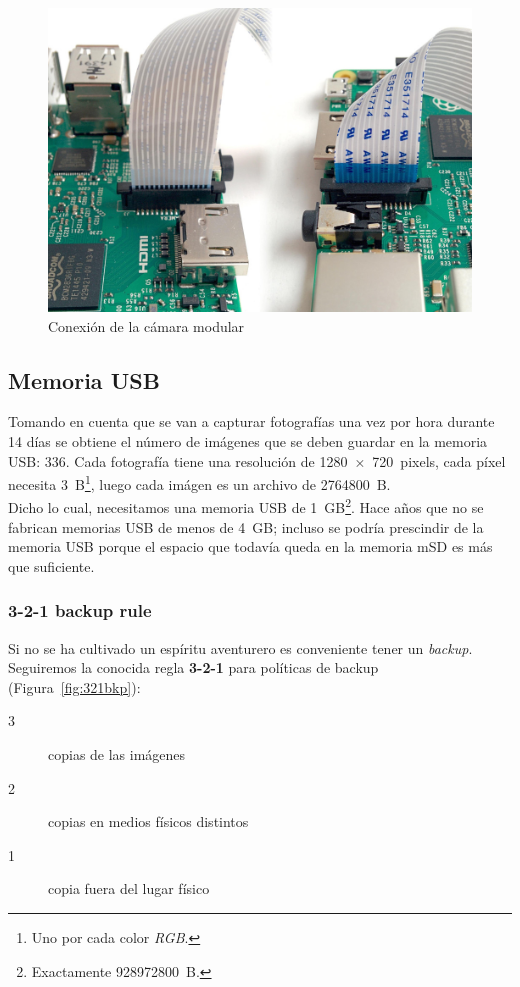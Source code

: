 \documentclass[10pt,a4paper]{article}
\begin{document}
\begin{figure}
\centering
    \includegraphics[scale=0.15]{connect-camera.jpg}
    \caption{Conexi\'on de la c\'amara modular}
    \label{fig:ribbon}
\end{figure}

\subsection{Memoria USB}

Tomando en cuenta que se van a capturar fotograf\'ias una vez por hora durante 14 d\'ias se obtiene el n\'umero de im\'agenes que se deben guardar en la memoria USB: $336$. Cada fotograf\'ia tiene una resoluci\'on de \SI{1280x720}{pixels}, cada p\'ixel necesita \SI{3}{B}\footnote{Uno por cada color \emph{RGB}.}, luego cada im\'agen es un archivo de \SI{2764800}{B}.\\

Dicho lo cual, necesitamos una memoria USB de \SI{1}{GB}\footnote{Exactamente \SI{928972800}{B}.}. Hace a\~nos que no se fabrican memorias USB de menos de \SI{4}{GB}; incluso se podr\'ia prescindir de la memoria USB porque el espacio que todav\'ia queda en la memoria mSD es m\'as que suficiente.

\subsubsection{3-2-1 backup rule}

Si no se ha cultivado un esp\'iritu aventurero es conveniente tener un \emph{backup}. Seguiremos la conocida regla \textbf{3-2-1} para pol\'iticas de backup (Figura~\ref{fig:321bkp}):
\begin{description}
    \item [3] copias de las im\'agenes
    \item [2] copias en medios f\'isicos distintos
    \item [1] copia fuera del lugar f\'isico
\end{description}
\end{document}
